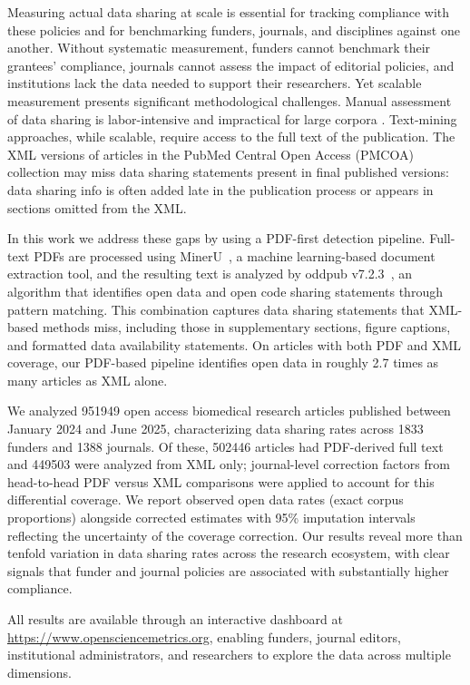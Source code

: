 Measuring actual data sharing at scale is essential for tracking compliance with these policies and for benchmarking funders, journals, and disciplines against one another. Without systematic measurement, funders cannot benchmark their grantees' compliance, journals cannot assess the impact of editorial policies, and institutions lack the data needed to support their researchers. Yet scalable measurement presents significant methodological challenges. Manual assessment of data sharing is labor-intensive and impractical for large corpora \cite{Iarkaeva2024-wo}. Text-mining approaches, while scalable, require access to the full text of the publication. The XML versions of articles in the PubMed Central Open Access (PMCOA) collection may miss data sharing statements present in final published versions: data sharing info is often added late in the publication process or appears in sections omitted from the XML.

In this work we address these gaps by using a PDF-first detection pipeline. Full-text PDFs are processed using MinerU~\cite{Wang2024mineru}, a machine learning-based document extraction tool, and the resulting text is analyzed by oddpub v7.2.3~\cite{Riedel2020-fk}, an algorithm that identifies open data and open code sharing statements through pattern matching. This combination captures data sharing statements that XML-based methods miss, including those in supplementary sections, figure captions, and formatted data availability statements. On articles with both PDF and XML coverage, our PDF-based pipeline identifies open data in roughly 2.7 times as many articles as XML alone.

We analyzed \num{951949} open access biomedical research articles published between January 2024 and June 2025, characterizing data sharing rates across \num{1833} funders and \num{1388} journals. Of these, \num{502446} articles had PDF-derived full text and \num{449503} were analyzed from XML only; journal-level correction factors from head-to-head PDF versus XML comparisons were applied to account for this differential coverage. We report observed open data rates (exact corpus proportions) alongside corrected estimates with 95\% imputation intervals reflecting the uncertainty of the coverage correction. Our results reveal more than tenfold variation in data sharing rates across the research ecosystem, with clear signals that funder and journal policies are associated with substantially higher compliance.

All results are available through an interactive dashboard at \url{https://www.opensciencemetrics.org}, enabling funders, journal editors, institutional administrators, and researchers to explore the data across multiple dimensions.


